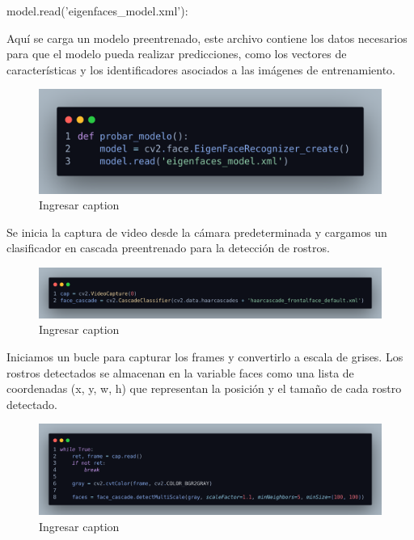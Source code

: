 \documentclass[12pt]{article}
\begin{document}
{\begin{itemize}
    {\bfseries\item model.read('eigenfaces\_model.xml'):} Aquí se carga un modelo preentrenado, este archivo contiene los datos necesarios para que el modelo pueda realizar predicciones, como los vectores de características y los identificadores asociados a las imágenes de entrenamiento.
\end{itemize}

\begin{figure}[h]
    \centering
    \includegraphics[width=0.65\linewidth]{imagenes/des22.png}
    \caption{Ingresar caption}
    \label{fig:enter-label}
\end{figure}

Se inicia la captura de video desde la cámara predeterminada y cargamos un clasificador en cascada preentrenado para la detección de rostros.

\begin{figure}[h]
    \centering
    \includegraphics[width=1.0\linewidth]{imagenes/des23.png}
    \caption{Ingresar caption}
    \label{fig:enter-label}
\end{figure}

Iniciamos un bucle para capturar los frames y convertirlo a escala de grises. Los rostros detectados se almacenan en la variable faces como una lista de coordenadas (x, y, w, h) que representan la posición y el tamaño de cada rostro detectado.

\begin{figure}[h]
    \centering
    \includegraphics[width=1.0\linewidth]{imagenes/des24.png}
    \caption{Ingresar caption}
    \label{fig:enter-label}
\end{figure}

}
\end{document}
